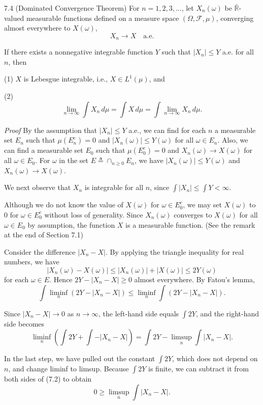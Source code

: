 \begin{thmbox}{7.4 (Dominated Convergence Theorem)}
For $n=1,2,3,\dots$, let $X_n(\omega)$ be $\bar{\mathbb{R}}$-valued measurable functions defined on a measure space $(\Omega,\mathcal{F},\mu)$, converging almost everywhere to $X(\omega)$,
\[
X_n \to X \quad \text{a.e.}
\]

If there exists a nonnegative integrable function $Y$ such that $|X_n|\le Y$ a.e. for all $n$, then

(1) $X$ is Lebesgue integrable, i.e., $X\in L^1(\mu)$, and

(2)
\[
\lim_{n\to\infty} \int X_n\, d\mu = \int X\, d\mu = \int \lim_{n\to\infty} X_n\, d\mu.
\]
\end{thmbox}

\textit{Proof} By the assumption that $|X_n|\le Y$ a.e., we can find for each $n$ a measurable set $E_n$ such that $\mu(E_n^c)=0$ and $|X_n(\omega)|\le Y(\omega)$ for all $\omega \in E_n$. Also, we can find a measurable set $E_0$ such that $\mu(E_0^c)=0$ and $X_n(\omega)\to X(\omega)$ for all $\omega \in E_0$. For $\omega$ in the set $E\triangleq \cap_{n\ge 0} E_n$, we have $|X_n(\omega)|\le Y(\omega)$ and $X_n(\omega)\to X(\omega)$.

We next observe that $X_n$ is integrable for all $n$, since $\int |X_n| \le \int Y < \infty$.

Although we do not know the value of $X(\omega)$ for $\omega \in E_0^c$, we may set $X(\omega)$ to $0$ for $\omega \in E_0^c$ without loss of generality. Since $X_n(\omega)$ converges to $X(\omega)$ for all $\omega \in E_0$ by assumption, the function $X$ is a measurable function. (See the remark at the end of Section 7.1)

Consider the difference $|X_n-X|$. By applying the triangle inequality for real numbers, we have
\[
|X_n(\omega)-X(\omega)| \le |X_n(\omega)|+|X(\omega)| \le 2Y(\omega)
\]
for each $\omega \in E$. Hence $2Y-|X_n-X|\ge 0$ almost everywhere. By Fatou's lemma,
\begin{equation}
\int \liminf_n (2Y-|X_n-X|) \le \liminf_n \int (2Y-|X_n-X|).
\tag{7.2}
\end{equation}

Since $|X_n-X|\to 0$ as $n\to\infty$, the left-hand side equals $\int 2Y$, and the right-hand side becomes
\[
\liminf_n \left( \int 2Y + \int -|X_n-X| \right)
=
\int 2Y - \limsup_n \int |X_n-X|.
\]

In the last step, we have pulled out the constant $\int 2Y$, which does not depend on $n$, and change liminf to limsup. Because $\int 2Y$ is finite, we can subtract it from both sides of (7.2) to obtain
\[
0 \ge \limsup_n \int |X_n-X|.
\]

